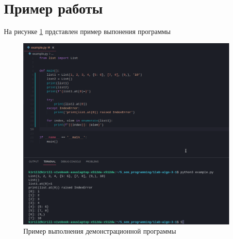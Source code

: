 \section*{Пример работы}

На рисунке \ref{fig:example} прдставлен пример выпонения программы

\begin{figure}[H]
    \centering
    \includegraphics[width=\linewidth]{photo/example}
    \caption{Пример выполнения демонстрационной программы}
    \label{fig:example}
\end{figure}